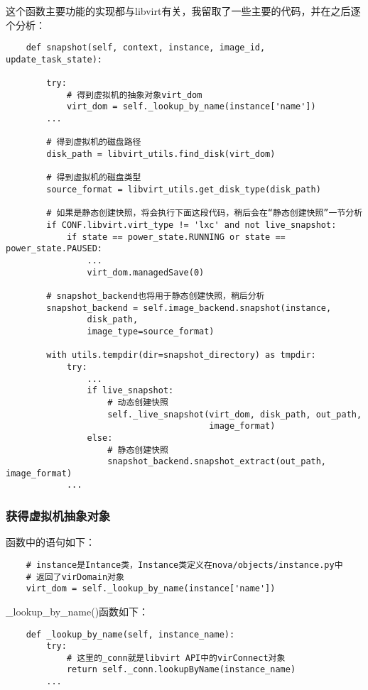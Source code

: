 \documentclass[a4paper,left=1.5cm,right=1.5cm,11pt]{article}
\begin{document}
	这个函数主要功能的实现都与libvirt有关，我留取了一些主要的代码，并在之后逐个分析：
	\begin{lstlisting}
	def snapshot(self, context, instance, image_id, update_task_state):

        try:
			# 得到虚拟机的抽象对象virt_dom
            virt_dom = self._lookup_by_name(instance['name'])
        ...

		# 得到虚拟机的磁盘路径
        disk_path = libvirt_utils.find_disk(virt_dom)

		# 得到虚拟机的磁盘类型
        source_format = libvirt_utils.get_disk_type(disk_path)

		# 如果是静态创建快照，将会执行下面这段代码，稍后会在“静态创建快照”一节分析
		if CONF.libvirt.virt_type != 'lxc' and not live_snapshot:
            if state == power_state.RUNNING or state == power_state.PAUSED:
                ...
                virt_dom.managedSave(0)

		# snapshot_backend也将用于静态创建快照，稍后分析
        snapshot_backend = self.image_backend.snapshot(instance,
                disk_path,
                image_type=source_format)

        with utils.tempdir(dir=snapshot_directory) as tmpdir:
            try:
				...
                if live_snapshot:
					# 动态创建快照
                    self._live_snapshot(virt_dom, disk_path, out_path,
                                        image_format)
                else:
					# 静态创建快照
                    snapshot_backend.snapshot_extract(out_path, image_format)
            ...
	\end{lstlisting}

\clearpage

\subsubsection{获得虚拟机抽象对象}
	函数中的语句如下：
	\begin{lstlisting}
	# instance是Intance类，Instance类定义在nova/objects/instance.py中
	# 返回了virDomain对象
	virt_dom = self._lookup_by_name(instance['name'])
	\end{lstlisting}

	\_lookup\_by\_name()函数如下：
	\begin{lstlisting}
	def _lookup_by_name(self, instance_name):
        try:
			# 这里的_conn就是libvirt API中的virConnect对象
            return self._conn.lookupByName(instance_name)
        ...
	\end{lstlisting}
\end{document}
